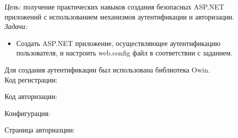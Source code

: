 \documentclass[pscyr]{hedlab}
\begin{document}
    \makeheader
    \emph{Цель:} получение практических навыков создания безопасных ASP.NET приложений с 
    использованием механизмов аутентификации и авторизации.\\
    \emph{Задачи:} 
    \begin{itemize}
        \item Создать ASP.NET приложение, осуществляющее аутентификацию пользователя, и настроить 
            web.config файл в соответствии с заданием.
    \end{itemize}
    Для создания аутентификации был использована библиотека Owin.\\
    Код регистрации:
    
    \pagebreak
    Код авторизации:
    
    \pagebreak
    Конфигурация:
    
    \pagebreak
    Страница авториазции:
    

    \pagebreak
\end{document}
